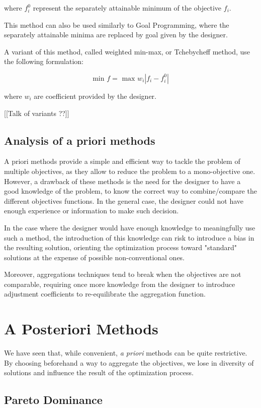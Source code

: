 where $f_i^0$ represent the separately attainable minimum of the objective $f_i$.

This method can also be used similarly to Goal Programming, where the separately attainable minima are replaced by goal given by the designer.

A variant of this method, called weighted min-max, or Tchebycheff method, use the following formulation:

\[ \text{min } f = \text{ max } w_i |f_i - f_i^0| \]

where $w_i$ are coefficient provided by the designer.

[[Talk of variants ??]]

\subsection{Analysis of a priori methods}

A priori methods provide a simple and efficient way to tackle the problem of multiple objectives, as they allow to reduce the problem to a mono-objective one.
However, a drawback of these methods is the need for the designer to have a good knowledge of the problem, to know the correct way to combine/compare the different objectives functions. In the general case, the designer could not have enough experience or information to make such decision.

In the case where the designer would have enough knowledge to meaningfully use such a method, the introduction of this knowledge can risk to introduce a bias in the resulting solution, orienting the optimization process toward "standard" solutions at the expense of possible non-conventional ones.

Moreover, aggregations techniques tend to break when the objectives are not comparable, requiring once more knowledge from the designer to introduce adjustment coefficients to re-equilibrate the aggregation function.

\section{A Posteriori Methods}

We have seen that, while convenient, \emph{a priori} methods can be quite restrictive. By choosing beforehand a way to aggregate the objectives, we lose in diversity of solutions and influence the result of the optimization process.

\subsection{Pareto Dominance}

